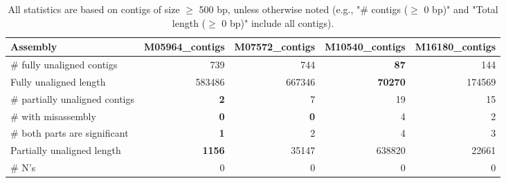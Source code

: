 \documentclass[12pt,a4paper]{article}
\begin{document}
\begin{table}[ht]
\begin{center}
\caption{All statistics are based on contigs of size $\geq$ 500 bp, unless otherwise noted (e.g., "\# contigs ($\geq$ 0 bp)" and "Total length ($\geq$ 0 bp)" include all contigs).}
\begin{tabular}{|l*{4}{|r}|}
\hline
Assembly & M05964\_contigs & M07572\_contigs & M10540\_contigs & M16180\_contigs \\ \hline
\# fully unaligned contigs & 739 & 744 & {\bf 87} & 144 \\ \hline
Fully unaligned length & 583486 & 667346 & {\bf 70270} & 174569 \\ \hline
\# partially unaligned contigs & {\bf 2} & 7 & 19 & 15 \\ \hline
\hspace{5mm}\# with misassembly & {\bf 0} & {\bf 0} & 4 & 2 \\ \hline
\hspace{5mm}\# both parts are significant & {\bf 1} & 2 & 4 & 3 \\ \hline
Partially unaligned length & {\bf 1156} & 35147 & 638820 & 22661 \\ \hline
\# N's & 0 & 0 & 0 & 0 \\ \hline
\end{tabular}
\end{center}
\end{table}
\end{document}
